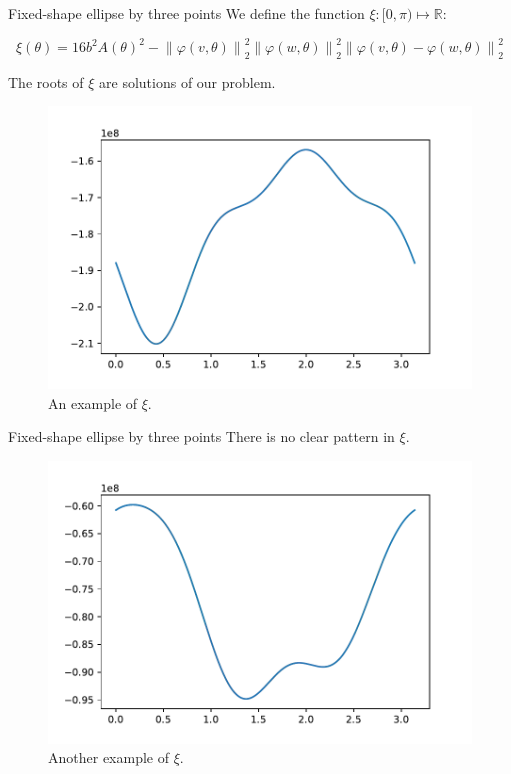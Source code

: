 \documentclass{beamer}
\newcommand{\R}{\mathbb{R}}
\newcommand{\norm}[2][2]{\left\lVert#2\right\rVert_{#1}}
\begin{document}
\begin{frame}{Fixed-shape ellipse by three points}
We define the function $\xi : [0, \pi) \mapsto \R$:

	\begin{equation*}
	\xi(\theta) = 16b^2A(\theta)^2 - \norm{\varphi(v, \theta)}^2\norm{\varphi(w, \theta)}^2\norm{\varphi(v, \theta)-\varphi(w, \theta)}^2
	\end{equation*}
	
The roots of $\xi$ are solutions of our problem.
	\begin{figure}
	\centering

	\includegraphics[scale=.5]{036}
	\caption{An example of $\xi$.}
\end{figure}
\end{frame}

\begin{frame}{Fixed-shape ellipse by three points}
	There is no clear pattern in $\xi$.
\begin{figure}
	\centering
	
	\includegraphics[scale=.5]{035}
	\caption{Another example of $\xi$.}
\end{figure}
\end{frame}
\end{document}
